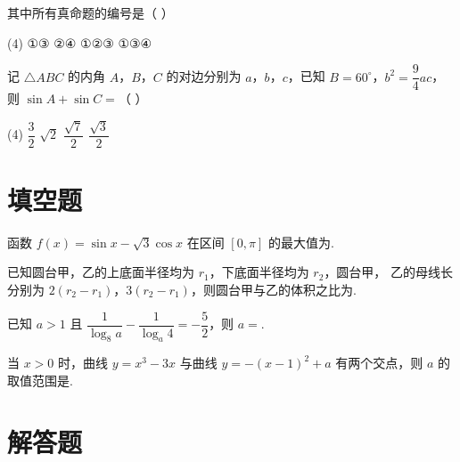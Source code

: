 \documentclass[UTF8,12pt]{ctexart}
\newcommand{\blank}{\underline{\hspace{4em}}}   %
\begin{document}
\begin{questions}
  其中所有真命题的编号是（ ）

    \begin{tasks}(4)
      \task ①③
      \task ②④
      \task ①②③
      \task ①③④
    \end{tasks}

  \item 记 $\triangle ABC$ 的内角 $A$，$B$，$C$ 的对边分别为 $a$，$b$，$c$，已知
    $B=60^\circ$，$b^2=\dfrac94ac$，则 $\sin A+\sin C=$（ ）

    \begin{tasks}(4)
      \task $\dfrac32$
      \task $\sqrt2$
      \task $\dfrac{\sqrt7}{2}$
      \task $\dfrac{\sqrt3}{2}$
    \end{tasks}

\end{questions}

\section*{填空题}

\begin{questions}[start=13]

  \item 函数 $f(x)=\sin x-\sqrt3\cos x$ 在区间 $[0,\pi]$ 的最大值为\blank.

  \item 已知圆台甲，乙的上底面半径均为 $r_1$，下底面半径均为 $r_2$，圆台甲，
    乙的母线长分别为 $2(r_2-r_1)$，$3(r_2-r_1)$，则圆台甲与乙的体积之比为\blank.

  \item 已知 $a>1$ 且 $\dfrac{1}{\log_8a}-\dfrac{1}{\log_a4}=-\dfrac52$，则 $a=$\blank.

  \item 当 $x>0$ 时，曲线 $y=x^3-3x$ 与曲线 $y=-(x-1)^2+a$ 有两个交点，则 $a$
    的取值范围是\blank.

\end{questions}

\section*{解答题}
\end{document}
